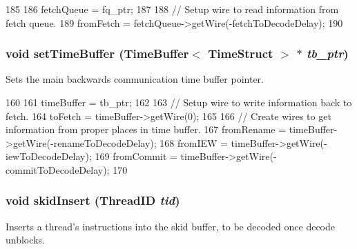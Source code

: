 \begin{DoxyCode}
185 {
186     fetchQueue = fq_ptr;
187 
188     // Setup wire to read information from fetch queue.
189     fromFetch = fetchQueue->getWire(-fetchToDecodeDelay);
190 }
\end{DoxyCode}
\hypertarget{classDefaultDecode_a2b521ea5f191fff72265f60d4ed5187b}{
\subsubsection[{setTimeBuffer}]{\setlength{\rightskip}{0pt plus 5cm}void setTimeBuffer ({\bf TimeBuffer}$<$ {\bf TimeStruct} $>$ $\ast$ {\em tb\_\-ptr})}}
\label{classDefaultDecode_a2b521ea5f191fff72265f60d4ed5187b}
Sets the main backwards communication time buffer pointer. 


\begin{DoxyCode}
160 {
161     timeBuffer = tb_ptr;
162 
163     // Setup wire to write information back to fetch.
164     toFetch = timeBuffer->getWire(0);
165 
166     // Create wires to get information from proper places in time buffer.
167     fromRename = timeBuffer->getWire(-renameToDecodeDelay);
168     fromIEW = timeBuffer->getWire(-iewToDecodeDelay);
169     fromCommit = timeBuffer->getWire(-commitToDecodeDelay);
170 }
\end{DoxyCode}
\hypertarget{classDefaultDecode_ac24515147270ef9b85991bbe13bd47af}{
\subsubsection[{skidInsert}]{\setlength{\rightskip}{0pt plus 5cm}void skidInsert ({\bf ThreadID} {\em tid})}}
\label{classDefaultDecode_ac24515147270ef9b85991bbe13bd47af}
Inserts a thread's instructions into the skid buffer, to be decoded once decode unblocks. 


